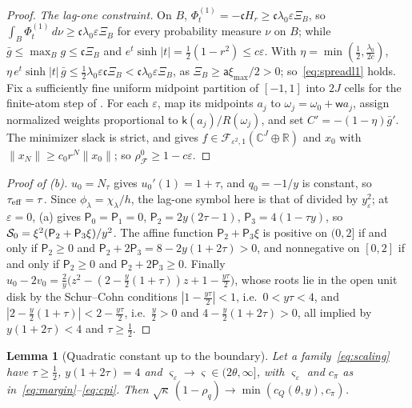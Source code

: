\documentclass[11pt]{article}
\newtheorem{lemma}[theorem]{Lemma}
\theoremstyle{definition}
\theoremstyle{remark}
\newcommand{\R}{\mathbb R}
\newcommand{\C}{\mathbb C}
\newcommand{\cF}{\mathcal F}
\newcommand{\sfP}{\mathsf P}
\newcommand{\sh}{\sinh}
\newcommand{\norm}[1]{\lVert #1\rVert}
\newcommand{\rhoz}{\rho_{\cF}^{0}}
\newcommand{\cQ}{c_{Q}}
\newcommand{\cpi}{c_{\pi}}
\newcommand{\teff}{\tau_{\rm eff}}
\begin{document}
\begin{proof}
\emph{The lag-one constraint.}  On \(B\), \(\Phi^{(1)}_t=-\mathfrak c H_r\ge\mathfrak c\lambda_0\varepsilon \Xi_B\), so \(\int_B\Phi^{(1)}_t\,d\nu\ge\mathfrak c\lambda_0\varepsilon \Xi_B\) for every probability measure
\(\nu\) on \(B\); while \(\bar g\le\max_Bg\le\mathfrak c \Xi_B\) and \(e^t\sh|t|=\frac12(1-r^2)\le c\varepsilon\).  With \(\eta=\min(\frac12,\frac{\lambda_0}{2c})\),
\(\eta\,e^t\sh|t|\,\bar g\le\frac12\lambda_0\varepsilon\mathfrak c \Xi_B<\mathfrak c\lambda_0\varepsilon \Xi_B\), as \(\Xi_B\ge \mathsf a\xi_{\max}/2>0\); so~\eqref{eq:spreadl1} holds.  Fix a sufficiently fine uniform midpoint partition of \([-1,1]\) into \(2J\) cells for the finite-atom step of .
For each \(\varepsilon\), map its midpoints \(a_j\) to \(\omega_j=\omega_0+\mathsf w a_j\), assign normalized weights
proportional to \(\mathsf k(a_j)/R(\omega_j)\), and set \(C'=-(1-\eta)\bar g'\).
The minimizer slack is strict, and  gives \(f\in\cF_{\varepsilon^2,1}(\C^J\oplus\R)\) and \(x_0\)
with \(\norm{x_N}\ge c_0r^N\norm{x_0}\); so \(\rhoz\ge1-c\varepsilon\).
\end{proof}

\begin{proof}[Proof of (b)]
\(u_0=N_\tau\) gives \(u_0'(1)=1+\tau\), and \(q_0=-1/y\) is constant, so \(\teff=\tau\).  Since \(\phi_\lambda=\chi_\lambda/h\), the
lag-one symbol here is that of  divided by \(y_\varepsilon^2\); at \(\varepsilon=0\), (a)
gives \(\sfP_0=\sfP_1=0\), \(\sfP_2=2y(2\tau-1)\), \(\sfP_3=4(1-\tau y)\), so \(\Szero=\xi^2(\sfP_2+\sfP_3\xi)/y^2\).  The affine function
\(\sfP_2+\sfP_3\xi\) is positive on \((0,2]\) if and only if \(\sfP_2\ge0\) and \(\sfP_2+2\sfP_3=8-2y(1+2\tau)>0\), and nonnegative on
\([0,2]\) if and only if \(\sfP_2\ge0\) and \(\sfP_2+2\sfP_3\ge0\).  Finally
\(u_0-2v_0=\frac2y\bigl(z^2-(2-\frac y2(1+\tau))z+1-\frac{y\tau}2\bigr)\), whose roots lie in the open unit disk by the
Schur--Cohn conditions \(|1-\frac{y\tau}2|<1\), i.e.\ \(0<y\tau<4\), and \(|2-\frac y2(1+\tau)|<2-\frac{y\tau}2\), i.e.\ \(\frac y2>0\) and
\(4-\frac y2(1+2\tau)>0\), all implied by \(y(1+2\tau)<4\) and \(\tau\ge\frac12\).
\end{proof}

\begin{lemma}[Quadratic constant up to the boundary]\label{lem:quadboundary}
Let a family~\eqref{eq:scaling} have \(\tau\ge\frac12\), \(y(1+2\tau)=4\) and \(\varsigma_\varepsilon\to\varsigma\in(2\theta,\infty]\), with
\(\varsigma_\varepsilon\) and \(\cpi\) as in~\eqref{eq:margin}--\eqref{eq:cpi}.  Then
\(\sqrt\kappa\,(1-\rho_q)\to\min(\cQ(\theta,y),\cpi)\).
\end{lemma}
\end{document}
